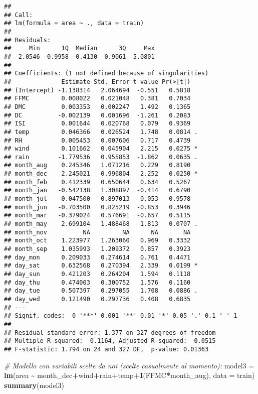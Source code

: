 \documentclass[
]{article}
\newenvironment{Shaded}{\begin{snugshade}}{\end{snugshade}}
\newcommand{\AttributeTok}[1]{\textcolor[rgb]{0.13,0.29,0.53}{#1}}
\newcommand{\CommentTok}[1]{\textcolor[rgb]{0.56,0.35,0.01}{\textit{#1}}}
\newcommand{\FunctionTok}[1]{\textcolor[rgb]{0.13,0.29,0.53}{\textbf{#1}}}
\newcommand{\NormalTok}[1]{#1}
\newcommand{\OtherTok}[1]{\textcolor[rgb]{0.56,0.35,0.01}{#1}}
\newcommand{\SpecialCharTok}[1]{\textcolor[rgb]{0.81,0.36,0.00}{\textbf{#1}}}
\begin{document}
\begin{verbatim}
## 
## Call:
## lm(formula = area ~ ., data = train)
## 
## Residuals:
##     Min      1Q  Median      3Q     Max 
## -2.0546 -0.9958 -0.4130  0.9061  5.0801 
## 
## Coefficients: (1 not defined because of singularities)
##              Estimate Std. Error t value Pr(>|t|)  
## (Intercept) -1.138314   2.064694  -0.551   0.5818  
## FFMC         0.008022   0.021048   0.381   0.7034  
## DMC          0.003353   0.002247   1.492   0.1365  
## DC          -0.002139   0.001696  -1.261   0.2083  
## ISI          0.001644   0.020768   0.079   0.9369  
## temp         0.046366   0.026524   1.748   0.0814 .
## RH           0.005453   0.007606   0.717   0.4739  
## wind         0.101662   0.045904   2.215   0.0275 *
## rain        -1.779536   0.955853  -1.862   0.0635 .
## month_aug    0.245346   1.071216   0.229   0.8190  
## month_dec    2.245021   0.996804   2.252   0.0250 *
## month_feb    0.412339   0.650644   0.634   0.5267  
## month_jan   -0.542138   1.308897  -0.414   0.6790  
## month_jul   -0.047500   0.897013  -0.053   0.9578  
## month_jun   -0.703500   0.825219  -0.853   0.3946  
## month_mar   -0.379024   0.576691  -0.657   0.5115  
## month_may    2.699104   1.488468   1.813   0.0707 .
## month_nov          NA         NA      NA       NA  
## month_oct    1.223977   1.263060   0.969   0.3332  
## month_sep    1.035993   1.209372   0.857   0.3923  
## day_mon      0.209033   0.274614   0.761   0.4471  
## day_sat      0.632568   0.270394   2.339   0.0199 *
## day_sun      0.421203   0.264204   1.594   0.1118  
## day_thu      0.474003   0.300752   1.576   0.1160  
## day_tue      0.507397   0.297055   1.708   0.0886 .
## day_wed      0.121490   0.297736   0.408   0.6835  
## ---
## Signif. codes:  0 '***' 0.001 '**' 0.01 '*' 0.05 '.' 0.1 ' ' 1
## 
## Residual standard error: 1.377 on 327 degrees of freedom
## Multiple R-squared:  0.1164, Adjusted R-squared:  0.0515 
## F-statistic: 1.794 on 24 and 327 DF,  p-value: 0.01363
\end{verbatim}

\begin{Shaded}
\begin{Highlighting}[]
\CommentTok{\# Modello con variabili scelte da noi (scelte casualmente al momento):}
\NormalTok{model3 }\OtherTok{=} \FunctionTok{lm}\NormalTok{(area }\SpecialCharTok{\textasciitilde{}}\NormalTok{ month\_dec}\SpecialCharTok{+}\NormalTok{wind}\SpecialCharTok{+}\NormalTok{rain}\SpecialCharTok{+}\NormalTok{temp}\SpecialCharTok{+}\FunctionTok{I}\NormalTok{(FFMC}\SpecialCharTok{*}\NormalTok{month\_aug), }\AttributeTok{data =}\NormalTok{ train)}
\FunctionTok{summary}\NormalTok{(model3)}
\end{Highlighting}
\end{Shaded}
\end{document}
